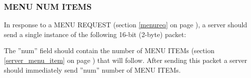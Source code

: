 \documentclass[a4paper,11pt]{article}
\begin{document}
\subsubsection{MENU NUM ITEMS}
\label{server_menu_num_items}
\hfill\begin{minipage}{\dimexpr\textwidth-1.4cm}
In response to a MENU REQUEST (section \ref{menureq} on page \pageref{menureq}),
a server should send a single instance of the following 16-bit (2-byte) packet:

\vspace{0.2cm}


\vspace{0.5cm}

The ''num'' field should contain the number of MENU ITEMs
(section \ref{server_menu_item} on page \pageref{server_menu_item})
that will follow. After sending this packet a server should
immediately send ''num'' number of MENU ITEMs.
\end{minipage}

\vspace{0.5cm}
\end{document}
